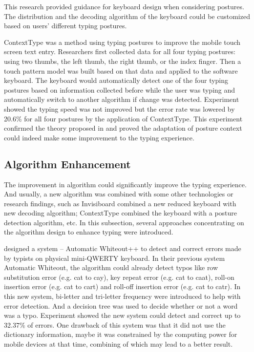 \documentclass[11pt]{article}
\begin{document}
This research provided guidance for keyboard design when considering postures. The distribution and the decoding algorithm of the keyboard could be customized based on users' different typing postures.

ContextType \citep{10.1145/2470654.2481386} was a method using typing postures to improve the mobile touch screen text entry. Researchers first collected data for all four typing postures: using two thumbs, the left thumb, the right thumb, or the index finger. Then a touch pattern model was built based on that data and applied to the software keyboard. The keyboard would automatically detect one of the four typing postures based on information collected before while the user was typing and automatically switch to another algorithm if change was detected. Experiment showed the typing speed was not improved but the error rate was lowered by 20.6\% for all four postures by the application of ContextType. This experiment confirmed the theory proposed in \citet{10.1145/2371574.2371612} and proved the adaptation of posture context could indeed make some improvement to the typing experience.

\subsection{Algorithm Enhancement}
The improvement in algorithm could significantly improve the typing experience. And usually, a new algorithm was combined with some other technologies or research findings, such as Invisiboard \citep{10.1145/2935334.2935360} combined a new reduced keyboard with new decoding algorithm; ContextType \citep{10.1145/2470654.2481386} combined the keyboard with a posture detection algorithm, etc. In this subsection, several approaches concentrating on the algorithm design to enhance typing were introduced.

\citet{10.1145/1357054.1357147} designed a system -- Automatic Whiteout++ to detect and correct errors made by typists on physical mini-QWERTY keyboard. In their previous system Automatic Whiteout, the algorithm could already detect typos like row substitution error (e.g. cat to cay), key repeat error (e.g. cat to caat), roll-on insertion error (e.g. cat to cart) and roll-off insertion error (e.g. cat to catr). In this new system, bi-letter and tri-letter frequency were introduced to help with error detection. And a decision tree was used to decide whether or not a word was a typo. Experiment showed the new system could detect and correct up to 32.37\% of errors. One drawback of this system was that it did not use the dictionary information, maybe it was constrained by the computing power for mobile devices at that time, combining of which may lead to a better result.
\end{document}

